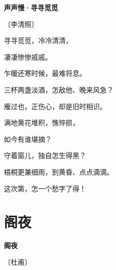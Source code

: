 \documentclass[12pt,UTF-8,openany,fontset=none]{ctexbook}
\begin{document}

\begin{center}
    {\bfseries 声声慢·寻寻觅觅}

    \vspace{18pt}

    \begin{large}\xuwen
        〔李清照〕
    \end{large}

\end{center}

    \vspace{18pt}  %

\begin{center}
    \begin{Large}

        寻寻觅觅，冷冷清清，

        凄凄惨惨戚戚。

        乍暖还寒时候，最难将息。

        三杯两盏淡酒，怎敌他、晚来风急？

        雁过也，正伤心，却是旧时相识。

        \vspace{18pt}  %

        满地黄花堆积，憔悴损，

        如今有谁堪摘？

        守着窗儿，独自怎生得黑？

        梧桐更兼细雨，到黄昏、点点滴滴。

        这次第，怎一个愁字了得！

    \end{Large}

\end{center}

\vspace{8pt}
\clearpage

\section{阁夜}


\begin{center}
    {\bfseries 阁夜}

    \vspace{18pt}

    \begin{large}\xuwen
        〔杜甫〕
    \end{large}

\end{center}
\end{document}
